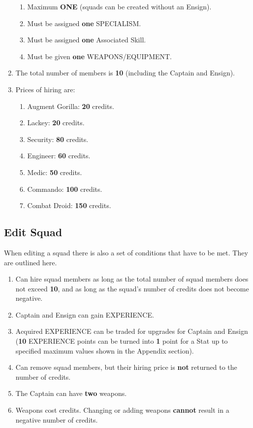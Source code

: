 \documentclass[12pt,a4paper]{article}
\begin{document}
\begin{enumerate}
\begin{enumerate}
                \item Maximum \textbf{ONE} (squads can be created without an Ensign).
                \item Must be assigned \textbf{one} SPECIALISM.
                \item Must be assigned \textbf{one} Associated Skill.
                \item Must be given \textbf{one} WEAPONS/EQUIPMENT.
               \end{enumerate}
 \item The total number of members is \textbf{10} (including the Captain and Ensign).
 \item Prices of hiring are: \begin{enumerate}
                              \item Augment Gorilla: \textbf{20} credits.
                              \item Lackey: \textbf{20} credits.
                              \item Security: \textbf{80} credits.
                              \item Engineer: \textbf{60} credits.
                              \item Medic: \textbf{50} credits.
                              \item Commando: \textbf{100} credits.
                              \item Combat Droid: \textbf{150} credits.
                             \end{enumerate}
\end{enumerate}

\subsection{Edit Squad}

When editing a squad there is also a set of conditions that have to be met. They are outlined here.

\begin{enumerate}
 \item Can hire squad members as long as the total number of squad members does not exceed \textbf{10}, and as long as the squad's number of credits does not become negative.
 \item Captain and Ensign can gain EXPERIENCE.
 \item Acquired EXPERIENCE can be traded for upgrades for Captain and Ensign (\textbf{10} EXPERIENCE points can be turned into \textbf{1} point for a Stat up to specified maximum values shown in the Appendix section).
 \item Can remove squad members, but their hiring price is \textbf{not} returned to the number of credits.
 \item The Captain can have \textbf{two} weapons.
 \item Weapons cost credits. Changing or adding weapons \textbf{cannot} result in a negative number of credits.
\end{enumerate}
\end{document}
